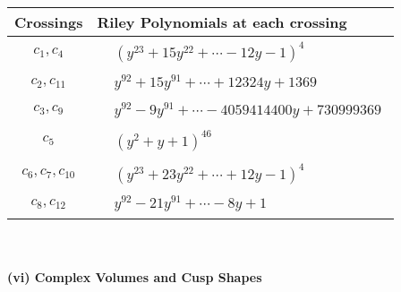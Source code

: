 \documentclass[1p]{elsarticle_modified}
\theoremstyle{definition}
\begin{document}
\begin{tabular}{m{50pt}|m{274pt}}
Crossings & \hspace{64pt}Riley Polynomials at each crossing \\
\hline $$\begin{aligned}c_{1},c_{4}\end{aligned}$$&$\begin{aligned}
&(y^{23}+15 y^{22}+\cdots-12 y-1)^{4}
\end{aligned}$\\
\hline $$\begin{aligned}c_{2},c_{11}\end{aligned}$$&$\begin{aligned}
&y^{92}+15 y^{91}+\cdots+12324 y+1369
\end{aligned}$\\
\hline $$\begin{aligned}c_{3},c_{9}\end{aligned}$$&$\begin{aligned}
&y^{92}-9 y^{91}+\cdots-4059414400 y+730999369
\end{aligned}$\\
\hline $$\begin{aligned}c_{5}\end{aligned}$$&$\begin{aligned}
&(y^2+y+1)^{46}
\end{aligned}$\\
\hline $$\begin{aligned}c_{6},c_{7},c_{10}\end{aligned}$$&$\begin{aligned}
&(y^{23}+23 y^{22}+\cdots+12 y-1)^{4}
\end{aligned}$\\
\hline $$\begin{aligned}c_{8},c_{12}\end{aligned}$$&$\begin{aligned}
&y^{92}-21 y^{91}+\cdots-8 y+1
\end{aligned}$\\
\hline
\end{tabular}\\~\\
\newpage\flushleft \textbf{(vi) Complex Volumes and Cusp Shapes}
\end{document}
